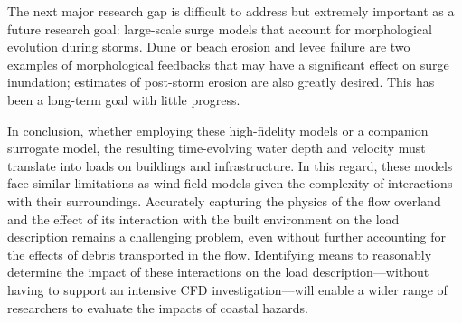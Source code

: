 The next major research gap is difficult to address but extremely important as a future research goal: large-scale surge models that account for morphological evolution during storms. Dune or beach erosion and levee failure are two examples of morphological feedbacks that may have a significant effect on surge inundation; estimates of post-storm erosion are also greatly desired. This has been a long-term goal with little progress.

In conclusion, whether employing these high-fidelity models or a companion surrogate model, the resulting time-evolving water depth and velocity must translate into loads on buildings and infrastructure. In this regard, these models face similar limitations as wind-field models given the complexity of interactions with their surroundings. Accurately capturing the physics of the flow overland and the effect of its interaction with the built environment on the load description remains a challenging problem, even without further accounting for the effects of debris transported in the flow. Identifying means to reasonably determine the impact of these interactions on the load description---without having to support an intensive CFD investigation---will enable a wider range of researchers to evaluate the impacts of coastal hazards. 


